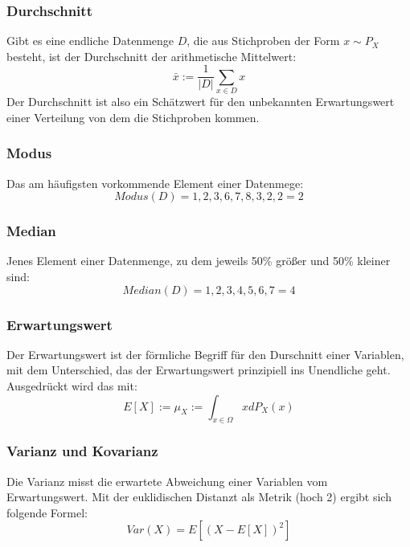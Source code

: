 \documentclass[letterpaper, titlepage]{article}
\begin{document}
\vspace*{0.35cm}

\subsubsection{Durchschnitt}\label{Durchschnitt}
Gibt es eine endliche Datenmenge $D$, die aus Stichproben der Form $x\sim P_X$ besteht, ist der Durchschnitt der arithmetische Mittelwert:
$$\bar{x} := \frac{1}{|D|}\sum_{x\in D} x$$
Der Durchschnitt ist also ein Schätzwert für den unbekannten Erwartungswert einer Verteilung von dem die Stichproben kommen.

\vspace{0.35cm}

\subsubsection{Modus}\label{Modus}
Das am häufigsten vorkommende Element einer Datenmege:
$$ Modus(D) = {1,2,3,6,7,8,3,2,2} = 2$$

\vspace{0.35cm}

\subsubsection{Median}\label{Median}
Jenes Element einer Datenmenge, zu dem jeweils 50\% größer und 50\% kleiner sind:
$$ Median(D) = {1,2,3,4,5,6,7} = 4$$

\vspace{0.35cm}

\subsubsection{Erwartungswert}\label{Erwartungswert}
Der Erwartungswert ist der förmliche Begriff für den Durschnitt einer Variablen, mit dem Unterschied, das der Erwartungswert prinzipiell ins Unendliche geht. Ausgedrückt wird das mit:
$$E[X] := \mu_X := \int_{x\in\Omega} x dP_X(x)$$  

\vspace{0.35cm}

\subsubsection{Varianz und Kovarianz}\label{Varianz und Kovarianz}
Die Varianz misst die erwartete Abweichung einer Variablen vom Erwartungswert. Mit der euklidischen Distanzt als Metrik (hoch 2) ergibt sich folgende Formel:
$$Var(X) = E[(X-E[X])^2]$$
\end{document}
